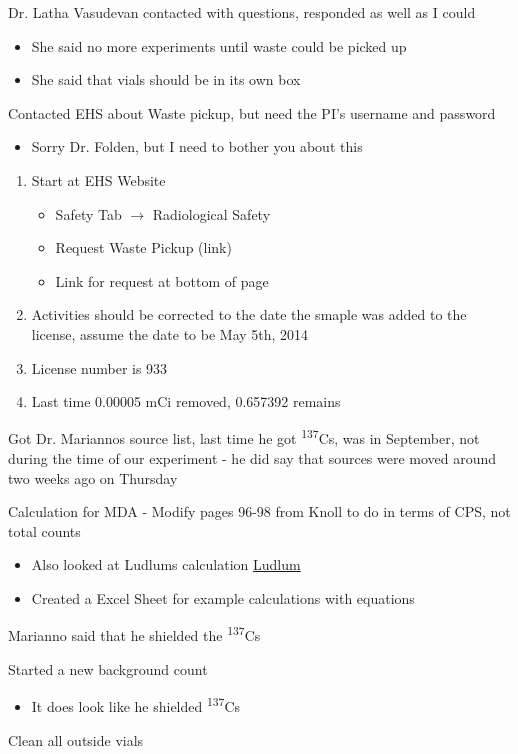 \documentclass[idxtotoc,hyperref,openany,oneside]{labbook} %
\newcommand{\cmark}{\ding{51}}%
\newcommand{\done}{\rlap{$\square$}{\raisebox{2pt}{\large\hspace{1pt}\cmark}}%
  \hspace{-2.5pt}}
\newcommand{\tss}{\textsuperscript}
\begin{document}
\begin{todolist}
\item[\done]{Dr. Latha Vasudevan contacted with questions,
  responded as well as I could}
  \begin{itemize}
  \item{She said no more experiments until waste could be picked up}
  \item{She said that vials should be in its own box}
  \end{itemize}
\item[\done]{Contacted EHS about Waste pickup, but need the PI's username
  and password}
  \begin{itemize}
  \item{Sorry Dr. Folden, but I need to bother you about this}
  \end{itemize}
  \begin{enumerate}
  \item{Start at EHS Website}
    \begin{itemize}
    \item{Safety Tab $\rightarrow$ Radiological Safety}
    \item{Request Waste Pickup (link)}
    \item{Link for request at bottom of page}
    \end{itemize}
  \item{Activities should be corrected to the date the smaple was
    added to the license, assume the date to be May 5th, 2014}
  \item{License number is 933}
  \item{Last time 0.00005 mCi removed, 0.657392 remains}
  \end{enumerate}
\end{todolist}


\begin{todolist}
\item[\done]{Got Dr. Mariannos source list, last time he got
  \tss{137}Cs, was in September, not during the time of our
  experiment - he did say that sources were moved around
  two weeks ago on Thursday}
\item[\done]{Calculation for MDA - Modify pages 96-98 from Knoll to do
  in terms of CPS, not total counts}
  \begin{itemize}
  \item{Also looked at Ludlums calculation
    \href{http://www.ludlums.com/multisites/medphys/images/stories/news_letters/nwsltr-43re.pdf}{Ludlum}}
  \item{Created a Excel Sheet for example calculations with equations}
  \end{itemize}
\item[\done]{Marianno said that he shielded the \tss{137}Cs}
\item[\done]{Started a new background count}
  \begin{itemize}
  \item{It does look like he shielded \tss{137}Cs}
  \end{itemize}
\item[\done]{Clean all outside vials}
\end{todolist}
\end{document}

